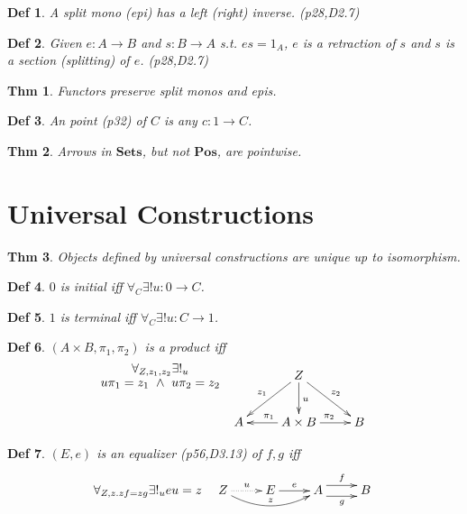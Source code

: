 \documentclass[10pt,twocolumn,letterpaper]{amsart}
\newtheorem{thm}{Thm}[section]
\newtheorem{dfn}{Def}[section]
\newcommand{\defn}[1]{\label{dfn:#1}{\em #1}}
\begin{document}
  \begin{dfn}A \defn{split mono} (\defn{epi}) has a left (right) inverse. (p28,D2.7)\end{dfn}

  \begin{dfn}Given $e : A \to B$ and $s : B \to A$ s.t. $es = 1_A$, $e$ is a \defn{retraction}
    of $s$ and $s$ is a \defn{section} (\defn{splitting}) of $e$. (p28,D2.7)\end{dfn}

  \begin{thm}Functors preserve split monos and epis.\end{thm}

   \begin{dfn}An \defn{point} (p32) of $C$ is any $c : 1 \to C$.\end{dfn}
                  
   \begin{thm}Arrows in $\mathbf{Sets}$, but not $\mathbf{Pos}$, are pointwise.\end{thm}

\section{Universal Constructions}

  \begin{thm}Objects defined by universal constructions are unique up to isomorphism.
  \end{thm}

  \begin{dfn}$0$ is \defn{initial} iff
    $\forall_C \exists! u : 0 \to C$.
  \end{dfn}

  \begin{dfn}$1$ is \defn{terminal} iff
    $\forall_C \exists! u : C \to 1 $.
  \end{dfn}

  \begin{dfn}$(A \times B,\pi_1,\pi_2)$ is a \defn{product} iff
    \[\xymatrix{
    {}\save[]+<-1cm,0cm>*\txt<8pc>{$\forall_{Z,z_1,z_2} \exists!_u$\\$u\pi_1 = z_1 ~\wedge~ u\pi_2 = z_2$}\restore
    &      & Z \ar[dl]_{z_1} \ar[dr]^{z_2} \ar[d]^u & \\
    &    A & \ar[l]_{\pi_1} A \times B \ar[r]^{\pi_2} & B \\
    }\]
  \end{dfn}

  \begin{dfn}$(E,e)$ is an \defn{equalizer} (p56,D3.13) of $f,g$ iff
     \[\forall_{Z,z . zf = zg} \exists!_u eu = z \quad
     \xymatrix{
     Z \ar@{..>}[r]^u \ar@/_1pc/[rr]^{z} & E \ar[r]^e & A \ar@<1ex>[r]^f \ar@<-1ex>[r]_g & B \\
     }\]
  \end{dfn}
\end{document}
